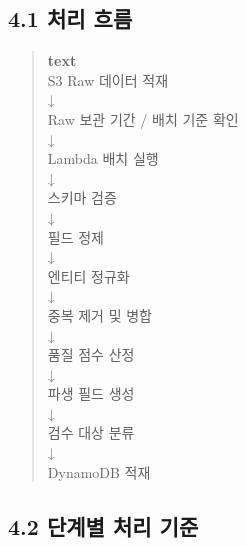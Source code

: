 \documentclass[12pt,a4paper]{article}
\newcommand{\DocNeedspace}[1]{\par\ifdim\dimexpr\pagegoal-\pagetotal\relax<#1\newpage\fi}
\begin{document}
\DocNeedspace{8\baselineskip}
\subsection*{4.1 처리 흐름}


\DocNeedspace{7\baselineskip}
\begin{quote}
\begin{scriptsize}
\ttfamily
\RaggedRight
\setlength{\parskip}{1pt}
\textcolor{LovvGreen}{\textbf{text}}\\[0.2em]
S3 Raw {\normalfont 데이터} {\normalfont 적재}\\
↓\\
Raw {\normalfont 보관} {\normalfont 기간} /\allowbreak{} {\normalfont 배치} {\normalfont 기준} {\normalfont 확인}\\
↓\\
Lambda {\normalfont 배치} {\normalfont 실행}\\
↓\\
{\normalfont 스키마} {\normalfont 검증}\\
↓\\
{\normalfont 필드} {\normalfont 정제}\\
↓\\
{\normalfont 엔티티} {\normalfont 정규화}\\
↓\\
{\normalfont 중복} {\normalfont 제거} {\normalfont 및} {\normalfont 병합}\\
↓\\
{\normalfont 품질} {\normalfont 점수} {\normalfont 산정}\\
↓\\
{\normalfont 파생} {\normalfont 필드} {\normalfont 생성}\\
↓\\
{\normalfont 검수} {\normalfont 대상} {\normalfont 분류}\\
↓\\
DynamoDB {\normalfont 적재}\\
\end{scriptsize}
\end{quote}


\newpage
\DocNeedspace{24\baselineskip}
\subsection*{4.2 단계별 처리 기준}
\end{document}
